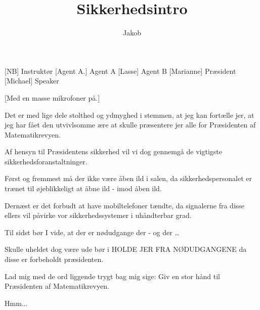 \documentclass[a4paper,11pt]{article}
\title{Sikkerhedsintro}
\author{Jakob}
\begin{document}
\maketitle

\begin{roles}
[NB] Instruktør
[Agent A.] Agent A
[Lasse] Agent B
[Marianne] Præsident
[Michael] Speaker
\end{roles}

\begin{props}
[Med en masse mikrofoner på.]
\end{props}
  
\begin{sketch}
 Det er med lige dele stolthed og ydmyghed i stemmen, at jeg kan fortælle jer,
at jeg har fået den utvivlsomme ære at skulle præsentere jer alle for
Præsidenten af Matematikrevyen.

 Af hensyn til Præsidentens sikkerhed vil vi dog gennemgå de vigtigste sikkerhedsforanstaltninger.


 Først og fremmest må der ikke være åben ild i salen, da sikkerhedspersonalet er
trænet til øjeblikkeligt at åbne ild - imod åben ild.

 Dernæst er det forbudt at have mobiltelefoner tændte, da signalerne fra disse ellers vil påvirke vor
sikkerhedssystemer i uhåndterbar grad.

 Til sidst bør I vide, at der er nødudgange der - og der \ldots


 Skulle uheldet dog være ude bør i HOLDE JER FRA NØDUDGANGENE da disse er forbeholdt præsidenten.

 Lad mig med de ord liggende trygt bag mig sige: Giv en stor hånd til Præsidenten af Matematikrevyen.






 Hmm...


\end{sketch}
\end{document}
